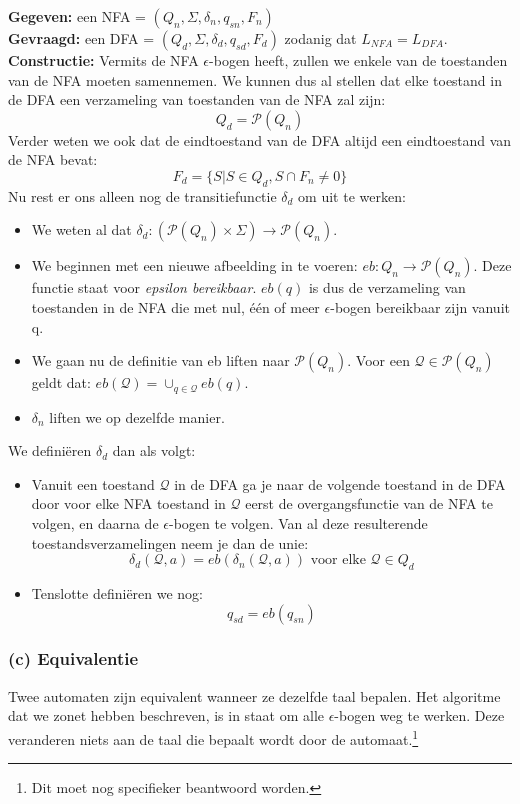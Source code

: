 \textbf{Gegeven:} een NFA = $(Q_n, \Sigma, \delta_n, q_{sn}, F_n)$ \\
\textbf{Gevraagd:} een DFA = $(Q_d, \Sigma, \delta_d, q_{sd}, F_d)$ zodanig dat $L_{NFA}=L_{DFA}$.\\
\textbf{Constructie:} Vermits de NFA $\epsilon$-bogen heeft, zullen we enkele van de toestanden van de NFA moeten samennemen. We kunnen dus al stellen dat elke toestand in de DFA een verzameling van toestanden van de NFA zal zijn:
$$ Q_d =  \mathcal{P}(Q_n)$$
Verder weten we ook dat de eindtoestand van de DFA altijd een eindtoestand van de NFA bevat:
$$ F_d = \{S | S \in Q_d, S \cap F_n \neq 0 \}  $$
Nu rest er ons alleen nog de transitiefunctie $\delta_d$ om uit te werken:
\begin{itemize}
\item We weten al dat $\delta_d : (\mathcal{P} (Q_n) \times \Sigma) \rightarrow \mathcal{P}(Q_n)$.
\item We beginnen met een nieuwe afbeelding in te voeren: $eb: Q_n \rightarrow \mathcal{P}(Q_n)$. Deze functie staat voor \emph{epsilon bereikbaar}. $eb(q)$ is dus de verzameling van toestanden in de NFA die met nul, \'e\'en of meer $\epsilon$-bogen bereikbaar zijn vanuit q.
\item We gaan nu de definitie van eb liften naar $\mathcal{P}(Q_n)$. Voor een $\mathcal{Q} \in \mathcal{P}(Q_n)$ geldt dat: $eb(\mathcal{Q}) = \cup_{q \in \mathcal{Q}} eb(q)$.
\item $\delta_n$ liften we op dezelfde manier.
\end{itemize}
We defini\"eren $\delta_d$ dan als volgt:
\begin{itemize}
\item Vanuit een toestand $\mathcal{Q}$ in de DFA ga je naar de volgende toestand in de DFA door voor elke NFA toestand in $\mathcal{Q}$ eerst de overgangsfunctie van de NFA te volgen, en daarna de $\epsilon$-bogen te volgen. Van al deze resulterende toestandsverzamelingen neem je dan de unie:
$$ \delta_d(\mathcal{Q},a) = eb(\delta_n(\mathcal{Q},a)) \text{ voor elke } \mathcal{Q} \in Q_d $$
\item Tenslotte defini\"eren we nog:
$$ q_{sd} = eb(q_{sn}) $$
\end{itemize}

\subsubsection*{(c) Equivalentie}
Twee automaten zijn equivalent wanneer ze dezelfde taal bepalen. Het algoritme dat we zonet hebben beschreven, is in staat om alle $\epsilon$-bogen weg te werken. Deze veranderen niets aan de taal die bepaalt wordt door de automaat.\footnote{Dit moet nog specifieker beantwoord worden.}

